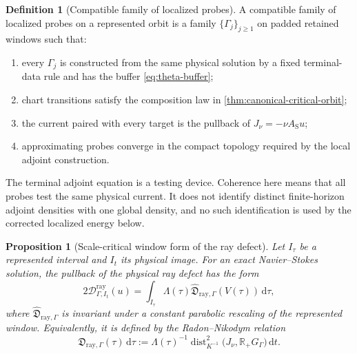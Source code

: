\documentclass[11pt]{amsart}
\numberwithin{equation}{section}
\theoremstyle{plain}
\newtheorem{proposition}[proposition]{Proposition}
\theoremstyle{definition}
\newtheorem{definition}[definition]{Definition}
\theoremstyle{remark}
\newcommand{\R}{\mathbb R}
\newcommand{\dd}{\,\mathrm d}
\newcommand{\RayDefect}{\mathscr D^{\mathrm{ray}}}
\begin{document}
\begin{definition}[Compatible family of localized probes]
\label{def:compatible-probe-family}
A compatible family of localized probes on a represented orbit is a family
\(\{\Gamma_j\}_{j\ge1}\) on padded retained windows such that:
\begin{enumerate}[label=\textup{(\roman*)},leftmargin=2.2em]
\item every \(\Gamma_j\) is constructed from the same physical solution by a
fixed terminal-data rule and has the buffer \eqref{eq:theta-buffer};
\item chart transitions satisfy the composition law in
\cref{thm:canonical-critical-orbit};
\item the current paired with every target is the pullback of
\(J_\nu=-\nu A_{\mathrm S}u\);
\item approximating probes converge in the compact topology required by the
local adjoint construction.
\end{enumerate}
\end{definition}

The terminal adjoint equation is a testing device.  Coherence here means that
all probes test the same physical current.  It does not identify distinct
finite-horizon adjoint densities with one global density, and no such
identification is used by the corrected localized energy below.

\begin{proposition}[Scale-critical window form of the ray defect]
\label{prop:critical-ray-defect}
Let \(I_\tau\) be a represented interval and \(I_t\) its physical image.  For
an exact Navier--Stokes solution, the pullback of the physical ray defect has
the form
\begin{equation}\label{eq:critical-ray-defect}
 2\RayDefect_{\Gamma,I_t}(u)
 =\int_{I_\tau}\Lambda(\tau)
 \widehat{\mathfrak D}_{\mathrm{ray},\Gamma}(V(\tau))\dd\tau,
\end{equation}
where \(\widehat{\mathfrak D}_{\mathrm{ray},\Gamma}\) is invariant under a
constant parabolic rescaling of the represented window.  Equivalently, it is
defined by the Radon--Nikodym relation
\begin{equation}\label{eq:critical-ray-radon-nikodym}
 \widehat{\mathfrak D}_{\mathrm{ray},\Gamma}(\tau)\dd\tau
 :=\Lambda(\tau)^{-1}
 \operatorname{dist}_{K^{-1}}^2
 \bigl(J_\nu,\R_+G_\Gamma\bigr)\dd t.
\end{equation}
\end{proposition}
\end{document}

